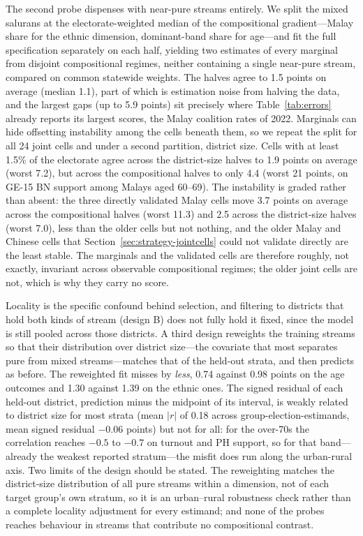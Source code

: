 \documentclass[11pt]{article}
\begin{document}
The second probe dispenses with near-pure streams entirely. We split the mixed salurans at the electorate-weighted median of the compositional gradient---Malay share for the ethnic dimension, dominant-band share for age---and fit the full specification separately on each half, yielding two estimates of every marginal from disjoint compositional regimes, neither containing a single near-pure stream, compared on common statewide weights. The halves agree to 1.5 points on average (median 1.1), part of which is estimation noise from halving the data, and the largest gaps (up to 5.9 points) sit precisely where Table~\ref{tab:errors} already reports its largest scores, the Malay coalition rates of 2022. Marginals can hide offsetting instability among the cells beneath them, so we repeat the split for all 24 joint cells and under a second partition, district size. Cells with at least 1.5\% of the electorate agree across the district-size halves to 1.9 points on average (worst 7.2), but across the compositional halves to only 4.4 (worst 21 points, on GE-15 BN support among Malays aged 60--69). The instability is graded rather than absent: the three directly validated Malay cells move 3.7 points on average across the compositional halves (worst 11.3) and 2.5 across the district-size halves (worst 7.0), less than the older cells but not nothing, and the older Malay and Chinese cells that Section~\ref{sec:strategy-jointcells} could not validate directly are the least stable. The marginals and the validated cells are therefore roughly, not exactly, invariant across observable compositional regimes; the older joint cells are not, which is why they carry no score.

Locality is the specific confound behind selection, and filtering to districts that hold both kinds of stream (design B) does not fully hold it fixed, since the model is still pooled across those districts. A third design reweights the training streams so that their distribution over district size---the covariate that most separates pure from mixed streams---matches that of the held-out strata, and then predicts as before. The reweighted fit misses by \emph{less}, 0.74 against 0.98 points on the age outcomes and 1.30 against 1.39 on the ethnic ones. The signed residual of each held-out district, prediction minus the midpoint of its interval, is weakly related to district size for most strata (mean $|r|$ of 0.18 across group-election-estimands, mean signed residual $-0.06$ points) but not for all: for the over-70s the correlation reaches $-0.5$ to $-0.7$ on turnout and PH support, so for that band---already the weakest reported stratum---the misfit does run along the urban-rural axis. Two limits of the design should be stated. The reweighting matches the district-size distribution of all pure streams within a dimension, not of each target group's own stratum, so it is an urban--rural robustness check rather than a complete locality adjustment for every estimand; and none of the probes reaches behaviour in streams that contribute no compositional contrast.
\end{document}
